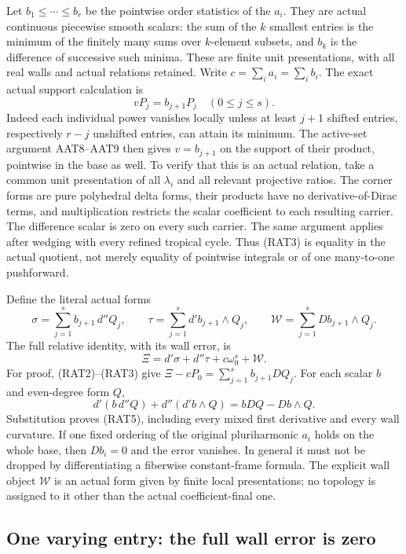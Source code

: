 Let $b_1\le\cdots\le b_r$ be the pointwise order statistics
of the $a_i$.  They are actual continuous piecewise smooth
scalars: the sum of the $k$ smallest entries is the minimum
of the finitely many sums over $k$-element subsets, and
$b_k$ is the difference of successive such minima.  These
are finite unit presentations, with all real walls and
actual relations retained.  Write $c=\sum_i a_i=\sum_i b_i$.
The exact actual support calculation is
\[
                         vP_j=b_{j+1}P_j\quad(0\le j\le s).
 \tag{RAT3}
\]
Indeed each individual power vanishes locally unless at
least $j+1$ shifted entries, respectively $r-j$ unshifted
entries, can attain its minimum.  The active-set argument
AAT8--AAT9 then gives $v=b_{j+1}$ on the support of their
product, pointwise in the base as well.  To verify that
this is an actual relation, take a common unit presentation
of all $\lambda_i$ and all relevant projective ratios.
The corner forms are pure polyhedral delta forms, their
products have no derivative-of-Dirac terms, and multiplication
restricts the scalar coefficient to each resulting carrier.
The difference scalar is zero on every such carrier.
The same argument applies after wedging with every refined
tropical cycle.  Thus (RAT3) is equality in the actual
quotient, not merely equality of pointwise integrals or
of one many-to-one pushforward.

Define the literal actual forms
\[
 \sigma=\sum_{j=1}^{s} b_{j+1}\,d''Q_j,
       \qquad \tau=\sum_{j=1}^{s} d'b_{j+1}\wedge Q_j,
       \qquad \mathcal W=\sum_{j=1}^{s} Db_{j+1}\wedge Q_j.
 \tag{RAT4}
\]
The full relative identity, with its wall error, is
\[
                    \Xi=d'\sigma+d''\tau+c\omega_0^s
                                                        +\mathcal W.
 \tag{RAT5}
\]
For proof, (RAT2)--(RAT3) give
$\Xi-cP_0=\sum_{j=1}^{s}b_{j+1}DQ_j$.
For each scalar $b$ and even-degree form $Q$,
\[
          d'(b\,d''Q)+d''(d'b\wedge Q)=bDQ-Db\wedge Q.
 \tag{RAT6}
\]
Substitution proves (RAT5), including every mixed first
derivative and every wall curvature.  If one fixed ordering
of the original pluriharmonic $a_i$ holds on the whole base,
then $Db_i=0$ and the error vanishes.  In general it must
not be dropped by differentiating a fiberwise constant-frame
formula.  The explicit wall object $\mathcal W$ is an actual
form given by finite local presentations; no topology is
assigned to it other than the actual coefficient-final one.

\subsection{One varying entry: the full wall error is zero}

